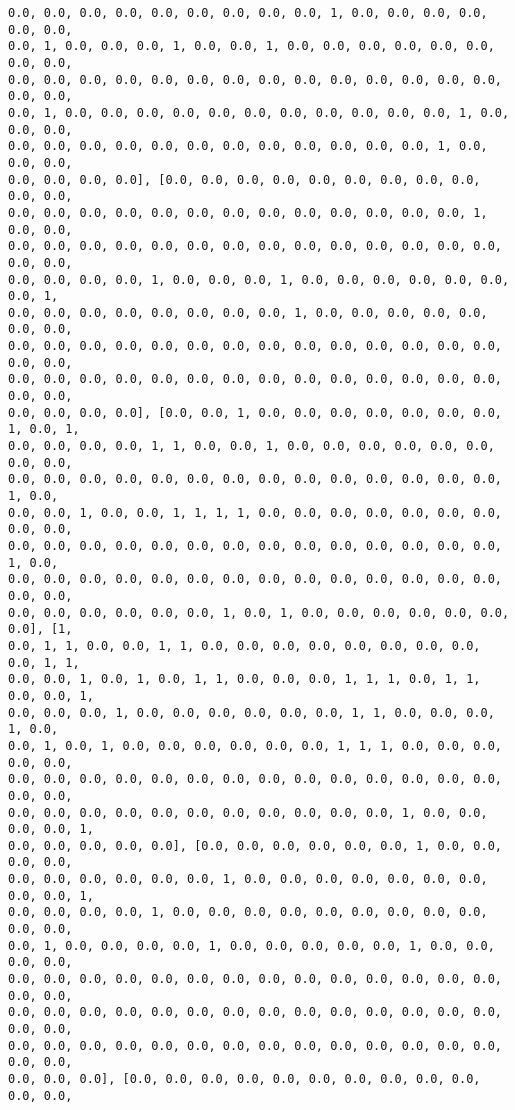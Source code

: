 \documentclass[11pt]{article}
\begin{document}
\begin{Verbatim}[commandchars=\\\{\}]
0.0, 0.0, 0.0, 0.0, 0.0, 0.0, 0.0, 0.0, 0.0, 1, 0.0, 0.0, 0.0, 0.0, 0.0, 0.0,
0.0, 1, 0.0, 0.0, 0.0, 1, 0.0, 0.0, 1, 0.0, 0.0, 0.0, 0.0, 0.0, 0.0, 0.0, 0.0,
0.0, 0.0, 0.0, 0.0, 0.0, 0.0, 0.0, 0.0, 0.0, 0.0, 0.0, 0.0, 0.0, 0.0, 0.0, 0.0,
0.0, 1, 0.0, 0.0, 0.0, 0.0, 0.0, 0.0, 0.0, 0.0, 0.0, 0.0, 0.0, 1, 0.0, 0.0, 0.0,
0.0, 0.0, 0.0, 0.0, 0.0, 0.0, 0.0, 0.0, 0.0, 0.0, 0.0, 0.0, 1, 0.0, 0.0, 0.0,
0.0, 0.0, 0.0, 0.0], [0.0, 0.0, 0.0, 0.0, 0.0, 0.0, 0.0, 0.0, 0.0, 0.0, 0.0,
0.0, 0.0, 0.0, 0.0, 0.0, 0.0, 0.0, 0.0, 0.0, 0.0, 0.0, 0.0, 0.0, 1, 0.0, 0.0,
0.0, 0.0, 0.0, 0.0, 0.0, 0.0, 0.0, 0.0, 0.0, 0.0, 0.0, 0.0, 0.0, 0.0, 0.0, 0.0,
0.0, 0.0, 0.0, 0.0, 1, 0.0, 0.0, 0.0, 1, 0.0, 0.0, 0.0, 0.0, 0.0, 0.0, 0.0, 1,
0.0, 0.0, 0.0, 0.0, 0.0, 0.0, 0.0, 0.0, 1, 0.0, 0.0, 0.0, 0.0, 0.0, 0.0, 0.0,
0.0, 0.0, 0.0, 0.0, 0.0, 0.0, 0.0, 0.0, 0.0, 0.0, 0.0, 0.0, 0.0, 0.0, 0.0, 0.0,
0.0, 0.0, 0.0, 0.0, 0.0, 0.0, 0.0, 0.0, 0.0, 0.0, 0.0, 0.0, 0.0, 0.0, 0.0, 0.0,
0.0, 0.0, 0.0, 0.0], [0.0, 0.0, 1, 0.0, 0.0, 0.0, 0.0, 0.0, 0.0, 0.0, 1, 0.0, 1,
0.0, 0.0, 0.0, 0.0, 1, 1, 0.0, 0.0, 1, 0.0, 0.0, 0.0, 0.0, 0.0, 0.0, 0.0, 0.0,
0.0, 0.0, 0.0, 0.0, 0.0, 0.0, 0.0, 0.0, 0.0, 0.0, 0.0, 0.0, 0.0, 0.0, 1, 0.0,
0.0, 0.0, 1, 0.0, 0.0, 1, 1, 1, 1, 0.0, 0.0, 0.0, 0.0, 0.0, 0.0, 0.0, 0.0, 0.0,
0.0, 0.0, 0.0, 0.0, 0.0, 0.0, 0.0, 0.0, 0.0, 0.0, 0.0, 0.0, 0.0, 0.0, 1, 0.0,
0.0, 0.0, 0.0, 0.0, 0.0, 0.0, 0.0, 0.0, 0.0, 0.0, 0.0, 0.0, 0.0, 0.0, 0.0, 0.0,
0.0, 0.0, 0.0, 0.0, 0.0, 0.0, 1, 0.0, 1, 0.0, 0.0, 0.0, 0.0, 0.0, 0.0, 0.0], [1,
0.0, 1, 1, 0.0, 0.0, 1, 1, 0.0, 0.0, 0.0, 0.0, 0.0, 0.0, 0.0, 0.0, 0.0, 1, 1,
0.0, 0.0, 1, 0.0, 1, 0.0, 1, 1, 0.0, 0.0, 0.0, 1, 1, 1, 0.0, 1, 1, 0.0, 0.0, 1,
0.0, 0.0, 0.0, 1, 0.0, 0.0, 0.0, 0.0, 0.0, 0.0, 1, 1, 0.0, 0.0, 0.0, 1, 0.0,
0.0, 1, 0.0, 1, 0.0, 0.0, 0.0, 0.0, 0.0, 0.0, 1, 1, 1, 0.0, 0.0, 0.0, 0.0, 0.0,
0.0, 0.0, 0.0, 0.0, 0.0, 0.0, 0.0, 0.0, 0.0, 0.0, 0.0, 0.0, 0.0, 0.0, 0.0, 0.0,
0.0, 0.0, 0.0, 0.0, 0.0, 0.0, 0.0, 0.0, 0.0, 0.0, 0.0, 1, 0.0, 0.0, 0.0, 0.0, 1,
0.0, 0.0, 0.0, 0.0, 0.0], [0.0, 0.0, 0.0, 0.0, 0.0, 0.0, 1, 0.0, 0.0, 0.0, 0.0,
0.0, 0.0, 0.0, 0.0, 0.0, 0.0, 1, 0.0, 0.0, 0.0, 0.0, 0.0, 0.0, 0.0, 0.0, 0.0, 1,
0.0, 0.0, 0.0, 0.0, 1, 0.0, 0.0, 0.0, 0.0, 0.0, 0.0, 0.0, 0.0, 0.0, 0.0, 0.0,
0.0, 1, 0.0, 0.0, 0.0, 0.0, 1, 0.0, 0.0, 0.0, 0.0, 0.0, 1, 0.0, 0.0, 0.0, 0.0,
0.0, 0.0, 0.0, 0.0, 0.0, 0.0, 0.0, 0.0, 0.0, 0.0, 0.0, 0.0, 0.0, 0.0, 0.0, 0.0,
0.0, 0.0, 0.0, 0.0, 0.0, 0.0, 0.0, 0.0, 0.0, 0.0, 0.0, 0.0, 0.0, 0.0, 0.0, 0.0,
0.0, 0.0, 0.0, 0.0, 0.0, 0.0, 0.0, 0.0, 0.0, 0.0, 0.0, 0.0, 0.0, 0.0, 0.0, 0.0,
0.0, 0.0, 0.0], [0.0, 0.0, 0.0, 0.0, 0.0, 0.0, 0.0, 0.0, 0.0, 0.0, 0.0, 0.0,

\end{Verbatim}
\end{document}
